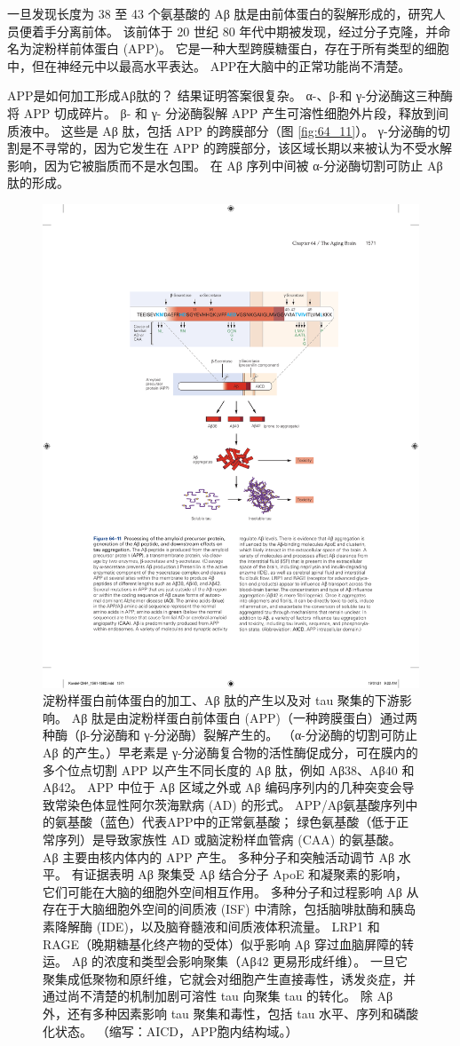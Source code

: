 一旦发现长度为 38 至 43 个氨基酸的 Aβ 肽是由前体蛋白的裂解形成的，研究人员便着手分离前体。
该前体于 20 世纪 80 年代中期被发现，经过分子克隆，并命名为淀粉样前体蛋白 (APP)。
它是一种大型跨膜糖蛋白，存在于所有类型的细胞中，但在神经元中以最高水平表达。
APP在大脑中的正常功能尚不清楚。


APP是如何加工形成Aβ肽的？
结果证明答案很复杂。
α-、β-和 γ-分泌酶这三种酶将 APP 切成碎片。
β- 和 γ- 分泌酶裂解 APP 产生可溶性细胞外片段，释放到间质液中。
这些是 Aβ 肽，包括 APP 的跨膜部分（图 \ref{fig:64_11}）。
γ-分泌酶的切割是不寻常的，因为它发生在 APP 的跨膜部分，该区域长期以来被认为不受水解影响，因为它被脂质而不是水包围。
在 Aβ 序列中间被 α-分泌酶切割可防止 Aβ 肽的形成。


\begin{figure}[htbp]
	\centering
	\includegraphics[width=0.8\linewidth]{chap64/fig_64_11}
	\caption{淀粉样蛋白前体蛋白的加工、Aβ 肽的产生以及对 tau 聚集的下游影响。 Aβ 肽是由淀粉样蛋白前体蛋白 (APP)（一种跨膜蛋白）通过两种酶（β-分泌酶和 γ-分泌酶）裂解产生的。 （α-分泌酶的切割可防止 Aβ 的产生。）早老素是 γ-分泌酶复合物的活性酶促成分，可在膜内的多个位点切割 APP 以产生不同长度的 Aβ 肽，例如 Aβ38、Aβ40 和 Aβ42。 APP 中位于 Aβ 区域之外或 Aβ 编码序列内的几种突变会导致常染色体显性阿尔茨海默病 (AD) 的形式。 APP/Aβ氨基酸序列中的氨基酸（蓝色）代表APP中的正常氨基酸； 绿色氨基酸（低于正常序列）是导致家族性 AD 或脑淀粉样血管病 (CAA) 的氨基酸。 Aβ 主要由核内体内的 APP 产生。 多种分子和突触活动调节 Aβ 水平。 有证据表明 Aβ 聚集受 Aβ 结合分子 ApoE 和凝聚素的影响，它们可能在大脑的细胞外空间相互作用。 多种分子和过程影响 Aβ 从存在于大脑细胞外空间的间质液 (ISF) 中清除，包括脑啡肽酶和胰岛素降解酶 (IDE)，以及脑脊髓液和间质液体积流量。 LRP1 和 RAGE（晚期糖基化终产物的受体）似乎影响 Aβ 穿过血脑屏障的转运。 Aβ 的浓度和类型会影响聚集（Aβ42 更易形成纤维）。 一旦它聚集成低聚物和原纤维，它就会对细胞产生直接毒性，诱发炎症，并通过尚不清楚的机制加剧可溶性 tau 向聚集 tau 的转化。 除 Aβ 外，还有多种因素影响 tau 聚集和毒性，包括 tau 水平、序列和磷酸化状态。 （缩写：AICD，APP胞内结构域。）}

\end{figure}
